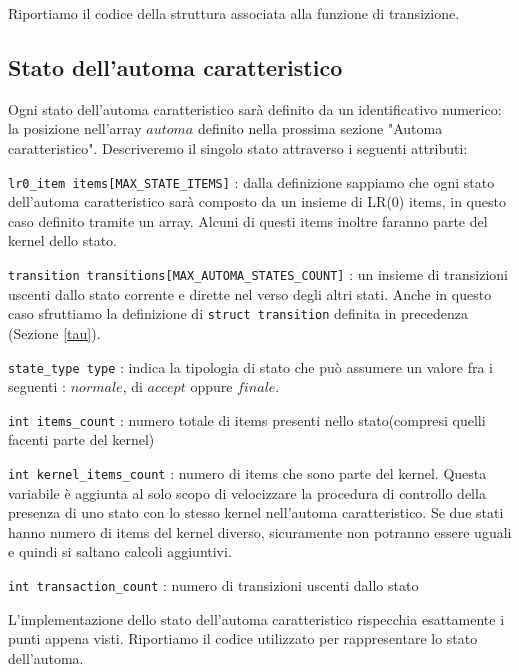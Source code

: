 \documentclass[12pt]{article}
\begin{document}
Riportiamo il codice della struttura associata alla funzione di transizione.




\subsection{Stato dell'automa caratteristico}
Ogni stato dell'automa caratteristico sarà definito da un identificativo numerico: la posizione nell'array $automa$ definito nella prossima sezione "Automa caratteristico". Descriveremo il singolo stato attraverso i seguenti attributi:
\begin{list}{-}{}
\item \texttt{lr0\_item items[MAX\_STATE\_ITEMS]} : dalla definizione sappiamo che ogni stato dell'automa caratteristico sarà composto da un insieme di LR(0) items, in questo caso definito tramite un array. Alcuni di questi items inoltre faranno parte del kernel dello stato.
\item \texttt{transition transitions[MAX\_AUTOMA\_STATES\_COUNT]} : un insieme di transizioni uscenti dallo stato corrente e dirette nel verso degli altri stati. Anche in questo caso sfruttiamo la definizione di \texttt{struct transition} definita in precedenza (Sezione \ref{tau}).
\item \texttt{state\_type type} : indica la tipologia di stato che può assumere un valore fra i seguenti : $normale$, di $accept$ oppure $finale$.
\item \texttt{int items\_count} : numero totale di items presenti nello stato(compresi quelli facenti parte del kernel)
\item \texttt{int kernel\_items\_count} : numero di items che sono parte del kernel. Questa variabile è aggiunta al solo scopo di velocizzare la procedura di controllo della presenza di uno stato con lo stesso kernel nell'automa caratteristico. Se due stati hanno numero di items del kernel diverso, sicuramente non potranno essere uguali e quindi si saltano calcoli aggiuntivi.
\item \texttt{int transaction\_count} : numero di transizioni uscenti dallo stato
\end{list}

L'implementazione dello stato dell'automa caratteristico rispecchia esattamente i punti appena visti.
Riportiamo il codice utilizzato per rappresentare lo stato dell'automa.

\end{document}
